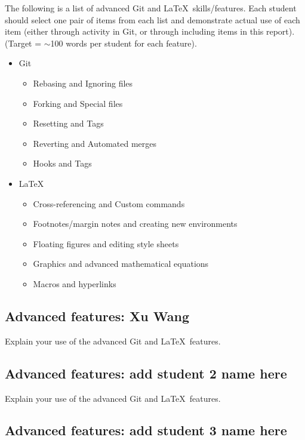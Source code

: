 \documentclass[a4paper, 11pt]{report}
\begin{document}
The following is a list of advanced Git and \LaTeX\ skills/features. Each student should select one pair of items from each list and demonstrate actual use of each item (either through activity in Git, or through including items in this report). (Target = $\sim$100 words per student for each feature).
\begin{itemize}
    \item Git
    \begin{itemize}
        \item Rebasing and Ignoring files
        \item Forking and Special files
        \item Resetting and Tags
        \item Reverting and Automated merges
        \item Hooks and Tags
    \end{itemize}
    \item \LaTeX\ 
    \begin{itemize}
        \item Cross-referencing and Custom commands
        \item Footnotes/margin notes and creating new environments
        \item Floating figures and editing style sheets
        \item Graphics and advanced mathematical equations
        \item Macros and hyperlinks
    \end{itemize}
\end{itemize}

\subsection{Advanced features: Xu Wang}

Explain your use of the advanced Git and \LaTeX\ features. 

\subsection{Advanced features: add student 2 name here}

Explain your use of the advanced Git and \LaTeX\ features. 

\subsection{Advanced features: add student 3 name here}
\end{document}

